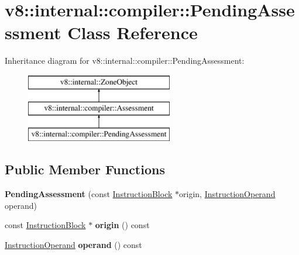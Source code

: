 \hypertarget{classv8_1_1internal_1_1compiler_1_1_pending_assessment}{}\section{v8\+:\+:internal\+:\+:compiler\+:\+:Pending\+Assessment Class Reference}
\label{classv8_1_1internal_1_1compiler_1_1_pending_assessment}
Inheritance diagram for v8\+:\+:internal\+:\+:compiler\+:\+:Pending\+Assessment\+:\begin{figure}[H]
\begin{center}
\leavevmode
\includegraphics[height=3.000000cm]{classv8_1_1internal_1_1compiler_1_1_pending_assessment}
\end{center}
\end{figure}
\subsection*{Public Member Functions}
\begin{DoxyCompactItemize}
\item 
{\bfseries Pending\+Assessment} (const \hyperlink{classv8_1_1internal_1_1compiler_1_1_instruction_block}{Instruction\+Block} $\ast$origin, \hyperlink{classv8_1_1internal_1_1compiler_1_1_instruction_operand}{Instruction\+Operand} operand)\hypertarget{classv8_1_1internal_1_1compiler_1_1_pending_assessment_a12e916bf8c4b95829af310f0d2c3b474}{}\label{classv8_1_1internal_1_1compiler_1_1_pending_assessment_a12e916bf8c4b95829af310f0d2c3b474}

\item 
const \hyperlink{classv8_1_1internal_1_1compiler_1_1_instruction_block}{Instruction\+Block} $\ast$ {\bfseries origin} () const \hypertarget{classv8_1_1internal_1_1compiler_1_1_pending_assessment_ab369166ae43c222d0d45c139391b689b}{}\label{classv8_1_1internal_1_1compiler_1_1_pending_assessment_ab369166ae43c222d0d45c139391b689b}

\item 
\hyperlink{classv8_1_1internal_1_1compiler_1_1_instruction_operand}{Instruction\+Operand} {\bfseries operand} () const \hypertarget{classv8_1_1internal_1_1compiler_1_1_pending_assessment_a1047e21df14797089383891da839d780}{}\label{classv8_1_1internal_1_1compiler_1_1_pending_assessment_a1047e21df14797089383891da839d780}

\end{DoxyCompactItemize}
